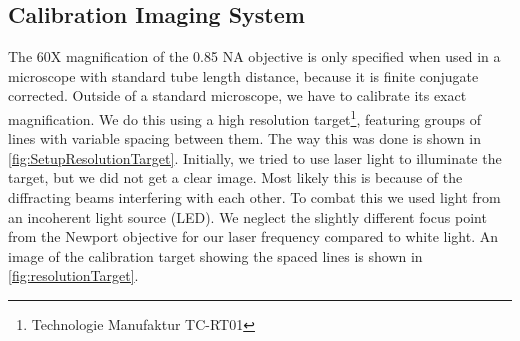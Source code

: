 \subsection{Calibration Imaging System}\label{subsec:CameraCalibration}

The 60X magnification of the 0.85 NA objective is only specified when used in a microscope with standard tube length distance, because it is finite conjugate corrected.
Outside of a standard microscope, we have to calibrate its exact magnification.
We do this using a high resolution target\footnote{Technologie Manufaktur TC-RT01}, featuring groups of lines with variable spacing between them. 
The way this was done is shown in \cref{fig:SetupResolutionTarget}.
Initially, we tried to use laser light to illuminate the target, but we did not get a clear image. 
Most likely this is because of the diffracting beams interfering with each other. 
To combat this we used light from an incoherent light source (\ac{LED}). 
We neglect the slightly different focus point from the Newport objective for our laser frequency compared to white light. 
An image of the calibration target showing the spaced lines is shown in \cref{fig:resolutionTarget}.

